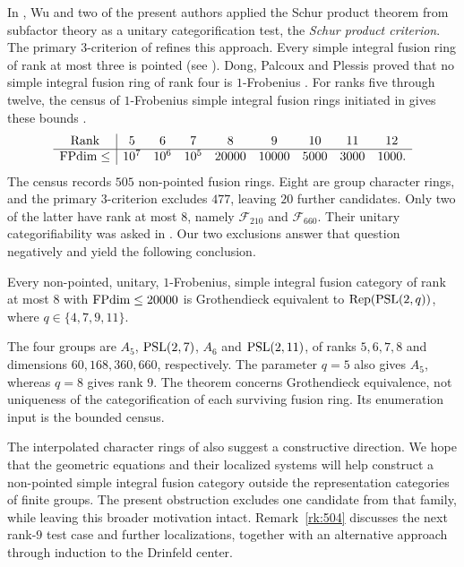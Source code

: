 \documentclass{amsart}
\begin{document}
In \cite{LPW20}, Wu and two of the present authors applied the Schur product theorem from subfactor theory \cite[Theorem~4.1]{Liuex} as a unitary categorification test, the \emph{Schur product criterion}. The primary $3$-criterion of \cite{HLPW23} refines this approach. Every simple integral fusion ring of rank at most three is pointed (see \cite[\S1]{DPPvan}). Dong, Palcoux and Plessis proved that no simple integral fusion ring of rank four is $1$-Frobenius \cite[Theorem~1.7]{DPPvan}. For ranks five through twelve, the census of $1$-Frobenius simple integral fusion rings initiated in \cite{LPW20} gives these bounds \cite[\S1]{BP24}.
\[
\begin{array}{c|cccccccc}
\text{Rank}&5&6&7&8&9&10&11&12\\\hline
\mathrm{FPdim}\le&10^7&10^6&10^5&20000&10000&5000&3000&1000.
\end{array}
\]
The census records $505$ non-pointed fusion rings. Eight are group character rings, and the primary $3$-criterion excludes $477$, leaving $20$ further candidates. Only two of the latter have rank at most $8$, namely $\mathcal F_{210}$ and $\mathcal F_{660}$. Their unitary categorifiability was asked in \cite[Question~1.1]{LPW20}. Our two exclusions answer that question negatively and yield the following conclusion.

\begin{theorem}\label{thm:ClassSimpleIntegral}
Every non-pointed, unitary, $1$-Frobenius, simple integral fusion category of rank at most $8$ with $\mathrm{FPdim}\le 20000$ is Grothendieck equivalent to $\mathrm{Rep}(\mathrm{PSL}(2,q))$, where $q\in\{4,7,9,11\}$.
\end{theorem}

The four groups are $A_5$, $\mathrm{PSL}(2,7)$, $A_6$ and $\mathrm{PSL}(2,11)$, of ranks
$5,6,7,8$ and dimensions $60,168,360,660$, respectively. The parameter $q=5$
also gives $A_5$, whereas $q=8$ gives rank $9$. The theorem concerns
Grothendieck equivalence, not uniqueness of the categorification of each
surviving fusion ring. Its enumeration input is the bounded census.

The interpolated character rings of \cite{LPRinter} also suggest a constructive direction. We hope that the geometric equations and their localized systems will help construct a non-pointed simple integral fusion category outside the representation categories of finite groups. The present obstruction excludes one candidate from that family, while leaving this broader motivation intact. Remark~\ref{rk:504} discusses the next rank-$9$ test case and further localizations, together with an alternative approach through induction to the Drinfeld center.
\end{document}
